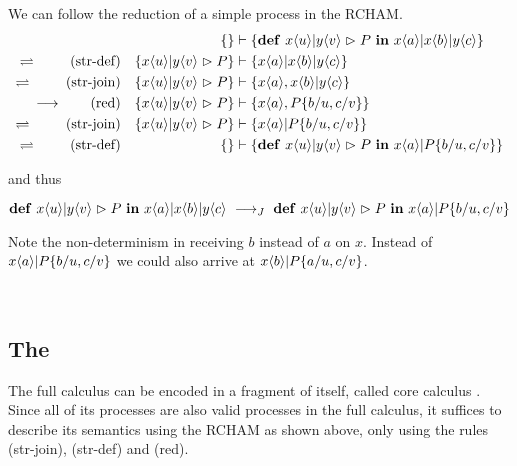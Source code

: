\begin{example}
\label{example_cham}
We can follow the reduction of a simple process in the RCHAM.
\begin{align*}
  &&\rchamcnfset*
    {}
    {\jdef
      {\jrct{\jrcv{x}{u} \jpat \jrcv{y}{v}}{P}}
      {\jsnd{x}{a} \jpar \jsnd{x}{b} \jpar \jsnd{y}{c}}}
  \\
  \rchamheating\ \tag{str-def}
  &&\rchamcnfset*
    {\jrct{\jrcv{x}{u} \jpat \jrcv{y}{v}}{P}}
    {\jsnd{x}{a} \jpar \jsnd{x}{b} \jpar \jsnd{y}{c}}
  \\
  \rchamheating\ \tag{str-join}
  &&\rchamcnfset*
    {\jrct{\jrcv{x}{u} \jpat \jrcv{y}{v}}{P}}
    {\jsnd{x}{a}, \jsnd{x}{b} \jpar \jsnd{y}{c}}
  \\
  \rchamreduction \tag{red}
  &&\rchamcnfset*
    {\jrct{\jrcv{x}{u} \jpat \jrcv{y}{v}}{P}}
    {\jsnd{x}{a}, P\substitution{\subst{b}{u}, \subst{c}{v}}}
  \\
  \rchamheating\ \tag{str-join}
  &&\rchamcnfset*
    {\jrct{\jrcv{x}{u} \jpat \jrcv{y}{v}}{P}}
    {\jsnd{x}{a} \jpar P\substitution{\subst{b}{u}, \subst{c}{v}}}
  \\
  \rchamheating\ \tag{str-def}
  &&\rchamcnfset*
    {}
    {\jdef
      {\jrct{\jrcv{x}{u} \jpat \jrcv{y}{v}}{P}}
      {\jsnd{x}{a} \jpar P\substitution{\subst{b}{u}, \subst{c}{v}}}}
\end{align*}

and thus

\begin{equation*}
  \jdef
    {\jrct{\jrcv{x}{u} \jpat \jrcv{y}{v}}{P}}
    {\jsnd{x}{a} \jpar \jsnd{x}{b} \jpar \jsnd{y}{c}}
  \ \joinreduction\ 
  \jdef
    {\jrct{\jrcv{x}{u} \jpat \jrcv{y}{v}}{P}}
    {\jsnd{x}{a} \jpar P\substitution{\subst{b}{u}, \subst{c}{v}}}
\end{equation*}

Note the non-determinism in receiving $b$ instead of $a$ on $x$.
Instead of
$ x\langle a\rangle | P\{ b / u, c / v \} $
we could also arrive at
$ x\langle b\rangle | P\{ a / u, c / v \} $.
\end{example}\ 
\\

\subsection{The \CoreJoinCalc}

The full calculus can be encoded in a fragment of itself, called core calculus
\cite{fournet_reflexive_1996}.
Since all of its processes are also valid processes in the full calculus,
it suffices to describe its semantics using the RCHAM as shown above,
only using the rules (str-join), (str-def) and (red).

